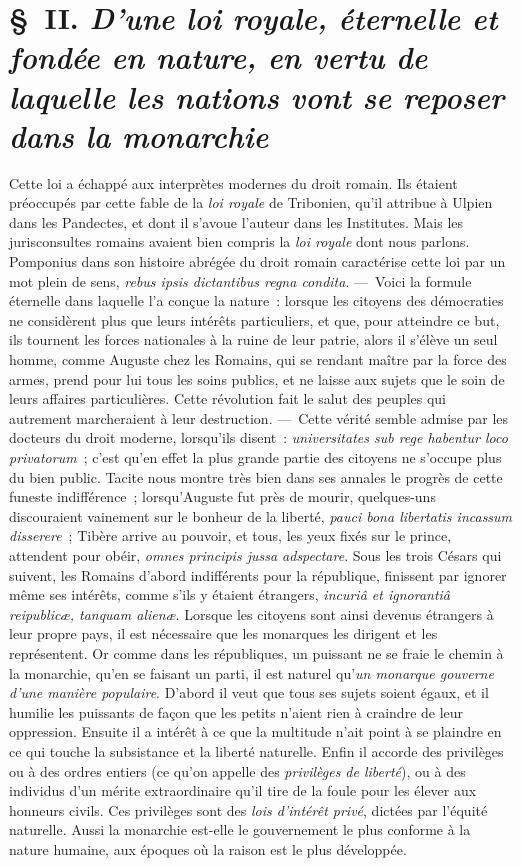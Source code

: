 \documentclass[french,twoside]{book} %
\begin{document}
\section[{§ II. D’une loi royale, éternelle et fondée en nature, en vertu de laquelle les nations vont se reposer dans la monarchie}]{§ II. {\itshape D’une loi royale, éternelle et fondée en nature, en vertu de laquelle les nations vont se reposer dans la monarchie}}
\noindent Cette loi a échappé aux interprètes modernes du droit romain. Ils étaient préoccupés par cette fable de la {\itshape loi royale} de Tribonien, qu’il attribue à Ulpien dans les Pandectes, et dont il s’avoue l’auteur dans les Institutes. Mais les jurisconsultes romains avaient bien compris la {\itshape loi royale} dont nous parlons. Pomponius dans son histoire abrégée du droit romain caractérise cette loi par un mot plein  de sens, \emph{{\itshape rebus ipsis dictantibus regna condita}}. — Voici la formule éternelle dans laquelle l’a conçue la nature : lorsque les citoyens des démocraties ne considèrent plus que leurs intérêts particuliers, et que, pour atteindre ce but, ils tournent les forces nationales à la ruine de leur patrie, alors il s’élève un seul homme, comme Auguste chez les Romains, qui se rendant maître par la force des armes, prend pour lui tous les soins publics, et ne laisse aux sujets que le soin de leurs affaires particulières. Cette révolution fait le salut des peuples qui autrement marcheraient à leur destruction. — Cette vérité semble admise par les docteurs du droit moderne, lorsqu’ils disent : \emph{{\itshape universitates sub rege habentur loco privatorum}} ; c’est qu’en effet la plus grande partie des citoyens ne s’occupe plus du bien public. Tacite nous montre très bien dans ses annales le progrès de cette funeste indifférence ; lorsqu’Auguste fut près de mourir, quelques-uns discouraient vainement sur le bonheur de la liberté, \emph{{\itshape pauci bona libertatis incassum disserere}} ; Tibère arrive au pouvoir, et tous, les yeux fixés sur le prince, attendent pour obéir, \emph{{\itshape omnes principis jussa adspectare}}. Sous les trois Césars qui suivent, les Romains d’abord indifférents pour la république, finissent par ignorer même ses intérêts, comme s’ils y étaient étrangers, \emph{{\itshape incuriâ et ignorantiâ reipublicæ, tanquam alienæ}}. Lorsque les citoyens sont ainsi devenus étrangers à leur propre pays, il est nécessaire que les monarques les dirigent et les représentent.  Or comme dans les républiques, un puissant ne se fraie le chemin à la monarchie, qu’en se faisant un parti, il est naturel qu’{\itshape un monarque gouverne d’une manière populaire}. D’abord il veut que tous ses sujets soient égaux, et il humilie les puissants de façon que les petits n’aient rien à craindre de leur oppression. Ensuite il a intérêt à ce que la multitude n’ait point à se plaindre en ce qui touche la subsistance et la liberté naturelle. Enfin il accorde des privilèges ou à des ordres entiers (ce qu’on appelle des {\itshape privilèges de liberté}), ou à des individus d’un mérite extraordinaire qu’il tire de la foule pour les élever aux honneurs civils. Ces privilèges sont des {\itshape lois d’intérêt privé}, dictées par l’équité naturelle. Aussi la monarchie est-elle le gouvernement le plus conforme à la nature humaine, aux époques où la raison est le plus développée.
\end{document}
